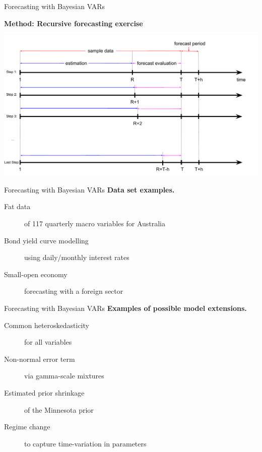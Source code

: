 \documentclass[notes,blackandwhite,mathsans]{beamer}
\begin{document}
\begin{frame}{Forecasting with Bayesian VARs}

\centering
\bigskip\textbf{Method: Recursive forecasting exercise}

\bigskip
\includegraphics[scale=0.4]{grphs/06recursive}
\end{frame}





\begin{frame}{Forecasting with Bayesian VARs}
\textbf{Data set examples. }
\bigskip
\begin{description}
\item[Fat data] {\color{mcxs2}of 117 quarterly macro variables for Australia} \\ [1ex]
\item[Bond yield curve modelling] {\color{mcxs2}using daily/monthly interest rates} \\ [1ex]
\item[Small-open economy] {\color{mcxs2}forecasting with a foreign sector} \\ [1ex]
\item[] {\color{mcxs2} }
\end{description}
\end{frame}



\begin{frame}{Forecasting with Bayesian VARs}
\textbf{Examples of possible model extensions. }
\bigskip
\begin{description}
\item[Common heteroskedasticity] {\color{mcxs2}for all variables}\\ [1ex]
\item[Non-normal error term] {\color{mcxs2}via gamma-scale mixtures}\\ [1ex]
\item[Estimated prior shrinkage] {\color{mcxs2}of the Minnesota prior}\\ [1ex]
\item[Regime change] {\color{mcxs2} to capture time-variation in parameters}
\end{description}
\end{frame}
\end{document}

